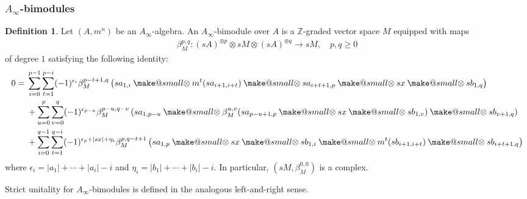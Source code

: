 \documentclass[a4paper, 11pt]{amsart}
\makeatletter
\theoremstyle{definition}
\newtheorem{defn}[thm]{Definition}
\theoremstyle{remark}
\numberwithin{equation}{section}
\newcommand{\smallotimes}{\mathbin{\mathpalette\make@small\otimes}}
\newcommand{\make@small}[2]{%
  \vcenter{\hbox{%
    $\m@th\ifx#1\displaystyle\scriptstyle\else\ifx#1\textstyle\scriptstyle
     \else\scriptscriptstyle\fi\fi#2$%
  }}%
}
\makeatother
\begin{document}
\subsubsection{\textbf{\textup{$A_\infty$-bimodules}}}
\begin{defn}\label{defn:Abimodule}
Let $(A, m^n)$ be an $A_\infty$-algebra. An $A_\infty$-bimodule over $A$ is a $\mathbb Z$-graded vector space $M$ equipped with maps
\begin{align*}
\beta_M^{p,q} \colon (sA)^{\otimes p} \otimes sM \otimes (sA)^{\otimes q} \to sM, \quad p, q \geq 0
\end{align*}
of degree $1$ satisfying the following identity:
\begin{align*}
0={}& \sum_{i=0}^{p-1}\sum_{t=1}^{p-i} (-1)^{\epsilon_i } \beta_M^{p-t+1, q} \left(sa_{1,i }\smallotimes m^t(sa_{i+1, i+t}) \smallotimes sa_{i+t+1, p } \smallotimes sx \smallotimes sb_{1,q}\right)\\
&+ \sum_{u=0}^p\sum_{v=0}^q (-1)^{\epsilon_{p-u}} \beta_M^{p-u, q-v} \left(sa_{1, p-u} \smallotimes \beta_M^{u, v}(sa_{p-u+1, p} \smallotimes sx \smallotimes sb_{1, v}) \smallotimes sb_{v+1, q}\right)\\
&+ \sum_{i=0}^{q-1}\sum_{t=1}^{q-i} (-1)^{\epsilon_p + |sx|+ \eta_i} \beta_M^{p, q-t+1} \left(sa_{1, p} \smallotimes sx \smallotimes sb_{1, i} \smallotimes m^t (sb_{i+1, i+t}) \smallotimes sb_{i+t+1,q}\right)
\end{align*}
where $\epsilon_i=|a_1|+\dotsb+|a_i|-i$ and $\eta_i=|b_1|+\dotsb+|b_i|-i$. In particular, $(sM,\beta_M^{0,0})$ is a complex.
\end{defn}
Strict unitality for $A_\infty$-bimodules is defined in the analogous left-and-right sense.
\end{document}
